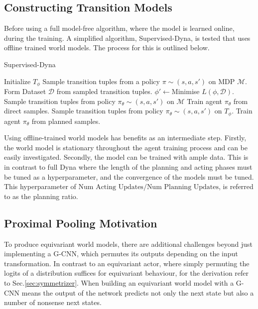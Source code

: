 \subsection{Constructing Transition Models}
Before using a full model-free algorithm, where the model is learned online, during the training. A simplified algorithm, Supervised-Dyna, is tested that uses offline trained world models. The process for this is outlined below.
\begin{algorithm}
	\caption{Supervised-Dyna}\label{alg:Supervised-Dyna}
	\begin{algorithmic}
		\State Initialize $T_\phi$
		\State Sample transition tuples from a policy $\pi \sim (s, a, s')$ on MDP $\mathcal{M}$.
		\State Form Dataset $\mathcal{D}$ from sampled transition tuples.
		\State $\phi' \leftarrow $Minimise $L(\phi , \mathcal{D})$.
		\EndFor
		\State Sample transition tuples from policy $\pi_\theta \sim (s, a, s')$ on $\mathcal{M}$
		\State Train agent $\pi_\theta$ from direct samples.
		\EndFor
		\State Sample transition tuples from policy $\pi_\theta \sim (s, a, s')$ on $T_\phi$.
		\State Train agent $\pi_\theta$ from planned samples.
		\EndFor
		\EndFor
	\end{algorithmic}
\end{algorithm}

Using offline-trained world models has benefits as an intermediate step. Firstly, the world model is stationary throughout the agent training process and can be easily investigated. Secondly, the model can be trained with ample data. This is in contrast to full Dyna where the length of the planning and acting phases must be tuned as a hyperparameter, and the convergence of the models must be tuned. This hyperparameter of $\text{Num Acting Updates}/\text{Num Planning Updates}$, is referred to as the planning ratio.


\subsection{Proximal Pooling Motivation}
To produce equivariant world models, there are additional challenges beyond just implementing a G-CNN, which permutes its outputs depending on the input transformation. In contrast to an equivariant actor, where simply permuting the logits of a distribution suffices for equivariant behaviour, for the derivation refer to Sec.\ref{sec:symmetrizer}. When building an equivariant world model with a G-CNN means the output of the network predicts not only the next state but also a number of nonsense next states.

